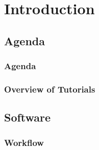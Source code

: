 \documentclass{beamer}
\begin{document}
\section{Introduction}
\subsection{Agenda}


\begin{frame}
  \frametitle{Agenda}
  \summary{}
  
  

\end{frame}


\begin{frame}
  \frametitle{Overview of Tutorials}
  \summary{}
  
  

\end{frame}


\subsection{Software}

\begin{frame}
  \frametitle{Workflow}
  \summary{}

  
  
\end{frame}
\end{document}
